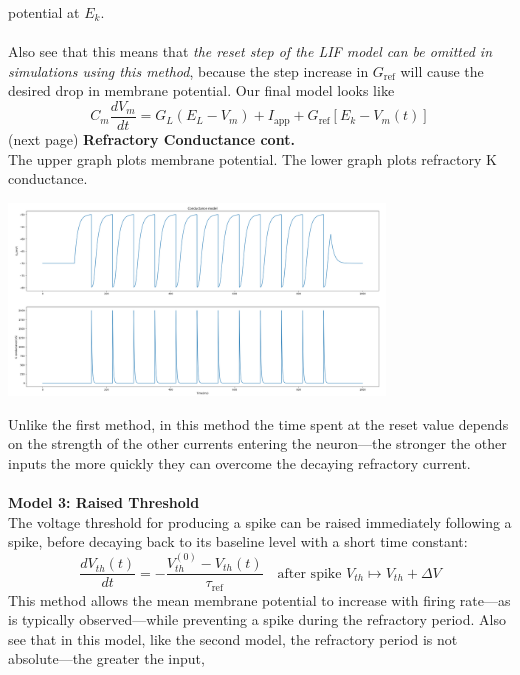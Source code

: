 \documentclass{report}
\begin{document}
potential at $E_k$.\\
\vspace{1mm}\\
Also see that this means that \textit{the reset step of the LIF model can be omitted in simulations using this method}, 
because the step increase in $G_{\text{ref}}$ will cause the desired drop in membrane potential.
Our final model looks like
\begin{equation*}
C_m\frac{dV_m}{dt}=G_L(E_L-V_m)+I_\text{app}+G_{\text{ref}}[E_k-V_m(t)]
\end{equation*}
(next page)\newpage
\noindent\textbf{Refractory Conductance cont.}\\
The upper graph plots membrane potential. The lower graph plots refractory K conductance.
\begin{center}
\includegraphics[width=10cm]{7}\\
\end{center}
Unlike the first method, in this method the time spent at the reset value depends on the strength of the other currents entering the neuron---the stronger the other inputs the more quickly they can overcome the decaying refractory current.\\
\vspace{1mm}\\
\textbf{Model 3: Raised Threshold}\\
The voltage threshold for producing a spike can be raised immediately following a spike, before decaying back to its baseline level with a short time constant:
\begin{equation*}
\frac{dV_{th}(t)}{dt}=-\frac{V_{th}^{(0)}-V_{th}(t)}{\tau_{\text{ref}}}\quad\text{after spike }V_{th}\mapsto V_{th}+\Delta V
\end{equation*}
This method allows the mean membrane potential to increase with firing rate---as is typically observed---while preventing a spike during the refractory period.
Also see that in this model, like the second model, the refractory period is not absolute---the greater the input, 
\end{document}

